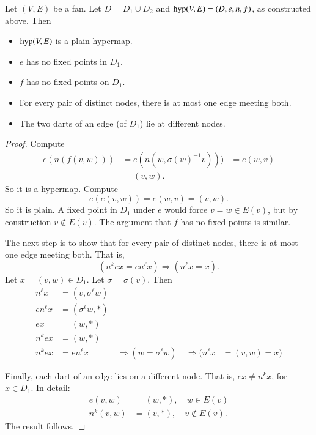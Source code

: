 \begin{lemma}
Let $(V,E)$ be a fan.  Let $D = D_1\cup D_2$
and ${\operatorname{hyp}}(V,E) = (D,e,n,f)$, as constructed above.  Then
    \begin{itemize}
    \item ${\operatorname{hyp}}(V,E)$ is a plain hypermap.
    \item  $e$ has no fixed
points in $D_1$.
    \item  $f$ has no fixed points on $D_1$.
    \item For every pair of distinct nodes, there is at most one
    edge meeting both.
    \item The two darts of an edge (of $D_1$) lie at different nodes.
    \end{itemize}
\end{lemma}

\begin{proof}  Compute
    $$
\begin{array}{lll}
e(n(f(v,w))) &= e(n(w,\sigma(w)^{-1} v))) &=
        e(w,v)\\ 
&= (v,w).
\end{array}
$$
So it is a hypermap. Compute
    $$e(e(v,w)) = e(w,v) = (v,w).$$
So it is plain. A fixed point in $D_1$ under $e$ would force $v = w\in E(v)$,
but by construction $v\not\in E(v)$.  The argument that $f$ has no
fixed points is similar.

The next step is to show that for every pair of distinct nodes, there is at most one edge
meeting both.
That is,
        $$(n^k e x = e n^\ell x)\Rightarrow (n^\ell x = x).$$
Let $x = (v,w)\in D_1$.  Let $\sigma=\sigma(v)$. Then
    $$
    \begin{array}{lllllll}
    n^\ell x &= (v,\sigma^\ell w)\\
    e n^\ell x &= (\sigma^\ell w,*)\\
    e x &= (w,*)\\
    n^k e x &= (w,*)\\
    n^k e x &= e n^\ell x &\ \Rightarrow (w = \sigma^\ell w) &\ \Rightarrow
    (n^\ell x &= (v,w) = x)
    \end{array}
    $$

Finally,  each dart of an edge lies on a different node.
That is, $e x \ne n^k x$, for $x\in D_1$.   In detail:
    $$
    \begin{array}{lll}
        e(v,w) &= (w,*),\quad w\in E(v)\\
        n^k(v,w) &= (v,*),\quad v\not\in E(v).
    \end{array}
    $$
The result follows.
\end{proof}

